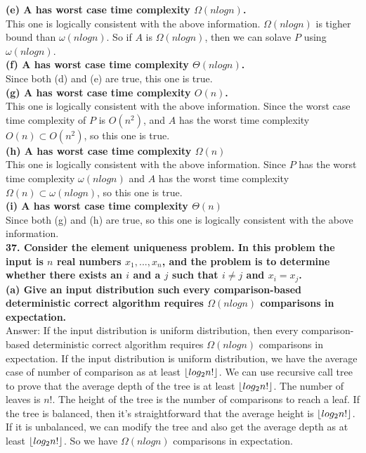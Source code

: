 \documentclass{article}
\DeclarePairedDelimiter\floor{\lfloor}{\rfloor}
\begin{document}
\textbf{(e) A has worst case time complexity $\Omega(nlogn)$.} \\ \newline
This one is logically consistent with the above information. $\Omega(nlogn)$ is tigher bound than $\omega(nlogn)$. So if $A$ is $\Omega(nlogn)$, then we can solave $P$ using $\omega(nlogn)$.\\ \newline
\textbf{(f) A has worst case time complexity $\Theta(nlogn)$.} \\ \newline
Since both (d) and (e) are true, this one is true.\\ \newline
\textbf{(g) A has worst case time complexity $O(n)$.} \\\newline
This one is logically consistent with the above information. Since the worst case time complexity of $P$ is $O(n^2)$, and $A$ has the worst time complexity $O(n) \subset O(n^2)$, so this one is true.\\ \newline
\textbf{(h) A has worst case time complexity $\Omega(n)$} \\\newline This one is logically consistent with the above information. Since $P$ has the worst time complexity $\omega(nlogn)$ and $A$ has the worst time complexity $\Omega(n) \subset \omega(nlogn)$, so this one is true.\\ \newline
\textbf{(i) A has worst case time complexity $\Theta(n)$} \\ \newline Since both (g) and (h) are true, so this one is logically consistent with the above information.\\ \newline
\textbf{37. Consider the element uniqueness problem. In this problem the input is $n$ real numbers $x_1,..., x_n$, and the problem is to determine whether there exists an $i$ and a $j$ such that $i\neq j$ and $x_i = x_j$.}\\\newline
\textbf{(a) Give an input distribution such every comparison-based deterministic correct algorithm requires $\Omega(nlogn)$ comparisons in expectation.} \\ \newline
Answer: If the input distribution is uniform distribution, then every comparison-based deterministic correct algorithm requires $\Omega(nlogn)$ comparisons in expectation. If the input distribution is uniform distribution, we have the average case of number of comparison as at least $\floor{log_2n!}$. We can use recursive call tree to prove that the average depth of the tree is at least $\floor{log_2n!}$. The number of leaves is $n!$. The height of the tree is the number of comparisons to reach a leaf. If the tree is balanced, then it's straightforward that the average height is $\floor{log_2n!}$. If it is unbalanced, we can modify the tree and also get the average depth as at least $\floor{log_2n!}$. So we have $\Omega(nlogn)$ comparisons in expectation.\\ \newline
\end{document}
